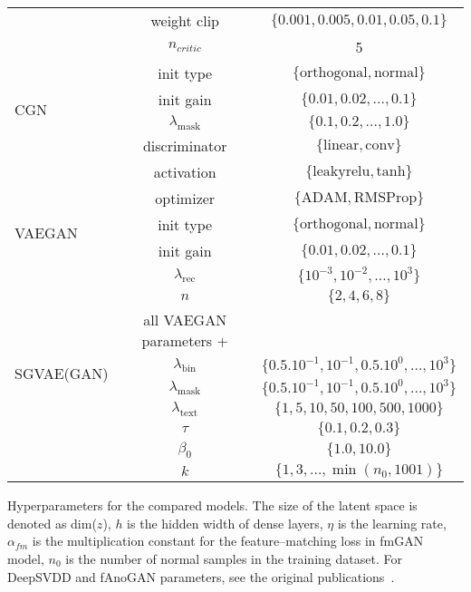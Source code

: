 \begin{tabular}{lcc}
            & weight clip & $ \lbrace 0.001, 0.005, 0.01, 0.05, 0.1  \rbrace $ \\
            & $n_{critic}$ & 5\\
            \midrule
\multirow{4}{*}{CGN}
            & init type & $\lbrace \text{orthogonal}, \text{normal} \rbrace$ \\
            & init gain & $\lbrace 0.01, 0.02, \ldots, 0.1 \rbrace$ \\
            & $\lambda_{\text{mask}}$ & $\lbrace 0.1, 0.2, \ldots, 1.0 \rbrace$ \\
            & discriminator & $\lbrace \text{linear}, \text{conv} \rbrace$ \\
            \midrule
\multirow{6}{*}{VAEGAN}
            & activation & $\lbrace \text{leakyrelu}, \text{tanh} \rbrace$ \\
            & optimizer & $\lbrace \text{ADAM}, \text{RMSProp} \rbrace $ \\        
            & init type & $\lbrace \text{orthogonal}, \text{normal} \rbrace$ \\
            & init gain & $\lbrace 0.01, 0.02, \ldots, 0.1 \rbrace$ \\
            & $\lambda_{\text{rec}}$ & $\lbrace 10^{-3}, 10^{-2}, \ldots,  10^{3} \rbrace$ \\
            & $n$ & $\lbrace 2, 4, 6, 8 \rbrace$ \\
            \midrule
\multirow{5}{*}{SGVAE(GAN)}
            & all VAEGAN parameters + &  \\
            & $\lambda_{\text{bin}}$ & $\lbrace 0.5.10^{-1}, 10 ^ {-1}, 0.5.10^{0}, \ldots, 10^3\rbrace$ \\
            & $\lambda_{\text{mask}}$ & $\lbrace 0.5.10^{-1}, 10 ^ {-1}, 0.5.10^{0}, \ldots, 10^3\rbrace$ \\
            & $\lambda_{\text{text}}$ & $\lbrace 1, 5, 10, 50, 100, 500, 1000 \rbrace$ \\
            & $\tau$ & $\lbrace 0.1,0.2,0.3 \rbrace$ \\
            & $\beta_0$ & $ \lbrace 1.0, 10.0 \rbrace $ \\
            & $k$ & $ \lbrace 1, 3, \ldots, \min(n_0, 1001) \rbrace $ \\
            \bottomrule
\end{tabular}
\caption{Hyperparameters for the compared models. The size of the latent space is denoted as dim($ z $), $h$ is the hidden width of dense layers, $\eta$ is the learning rate,  $\alpha_{fm}$ is the multiplication constant for the feature--matching loss in fmGAN model, $n_0$ is the number of normal samples in the training dataset. For DeepSVDD and fAnoGAN parameters, see the original publications~\cite{ruff2019deep, schleglFAnoGANFastUnsupervised2019}.}

